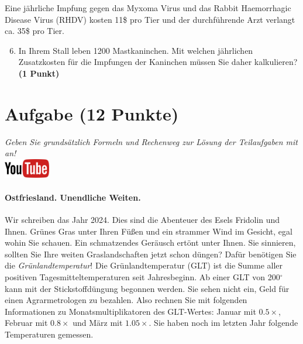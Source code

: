 \documentclass[a4paper, 9pt]{scrartcl}\usepackage[]{graphicx}\usepackage[]{xcolor}
\begin{document}
Eine j{\"a}hrliche Impfung gegen das Myxoma Virus und das Rabbit Haemorrhagic
Disease Virus (RHDV) kosten 11\$ pro Tier und der
durchf{\"u}hrende Arzt verlangt ca. 35\$ pro Tier.

\begin{enumerate}
  \setcounter{enumi}{5}
\item In Ihrem Stall leben 1200 Mastkaninchen. Mit welchen
  j{\"a}hrlichen Zusatzkosten f{\"u}r die Impfungen der Kaninchen m{\"u}ssen Sie daher
  kalkulieren? \textbf{(1 Punkt)}
\end{enumerate}
 
\clearpage

\section{Aufgabe \hfill (12 Punkte)}

\textit{Geben Sie grunds{\"a}tzlich Formeln und Rechenweg zur L{\"o}sung der
  Teilaufgaben mit an!} \\[1Ex]

\hfill\href{https://youtu.be/fiWGgCX-cE4}{\includegraphics[width =
  2cm]{img/youtube}} %
\hspace{2Ex}



\paragraph{Ostfriesland. Unendliche Weiten.}



Wir schreiben das Jahr 2024. Dies sind die Abenteuer
des Esels Fridolin und Ihnen. Gr{\"u}nes Gras unter Ihren F{\"u}{\ss}en und
ein strammer Wind im Gesicht, egal wohin Sie schauen. Ein schmatzendes
Ger{\"a}usch ert{\"o}nt unter Ihnen. Sie sinnieren, sollten Sie Ihre weiten
Graslandschaften jetzt schon d{\"u}ngen?  Daf{\"u}r ben{\"o}tigen Sie die
\textit{Gr{\"u}nlandtemperatur}! Die Gr{\"u}nlandtemperatur (GLT) ist die Summe aller
positiven Tagesmitteltemperaturen seit Jahresbeginn. Ab einer GLT von
200$^\circ$ kann mit der Stickstoffd{\"u}ngung begonnen werden. Sie sehen nicht
ein, Geld f{\"u}r einen Agrarmetrologen zu bezahlen. Also rechnen Sie mit
folgenden Informationen zu Monatsmultiplikatoren des GLT-Wertes: Januar mit
$0.5\times$, Februar mit $0.8\times$ und M{\"a}rz mit
$1.05\times$. Sie haben noch im letzten Jahr folgende Temperaturen
gemessen.
\end{document}
